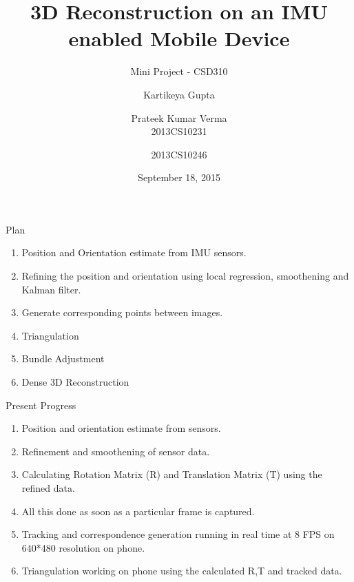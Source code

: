 \documentclass{beamer}
\title[3D reconstruction]{3D Reconstruction on an IMU enabled Mobile Device}
\subtitle{Mini Project - CSD310}
\author[Kartikeya \and Prateek]{\hspace{.063\textwidth} Kartikeya Gupta \and Prateek Kumar Verma \\\small 2013CS10231 \hspace{.1\textwidth} \and \small 2013CS10246}
\institute[IITD] %
{
  Department of Computer Science and Engineering\\
  IIT Delhi
  \and
  Under supervision of \\
  \textbf{Prof. Subhashis Banerjee} \\
  Department of Computer Science and Engineering
}
\date{September 18, 2015}
\begin{document}
\begin{frame}
  \titlepage
\end{frame}




\begin{frame}{Plan}{}
  \begin{enumerate}
  	\item Position and Orientation estimate from IMU sensors.
  	\item Refining the position and orientation using local regression, smoothening and Kalman filter.
  	\item Generate corresponding points between images.
  	\item Triangulation
  	\item Bundle Adjustment
  	\item Dense 3D Reconstruction
  \end{enumerate}
\end{frame}

\begin{frame}{Present Progress}{}
	\begin{enumerate}
		\item Position and orientation estimate from sensors.
    \item Refinement and smoothening of sensor data. 
    \item Calculating Rotation Matrix (R) and Translation Matrix (T) using the refined data.
    \item All this done as soon as a particular frame is captured.
		\item Tracking and correspondence generation running in real time at 8 FPS on 640*480 resolution on phone.
		\item Triangulation working on phone using the calculated R,T and tracked data.
	\end{enumerate}
\end{frame}
\end{document}
